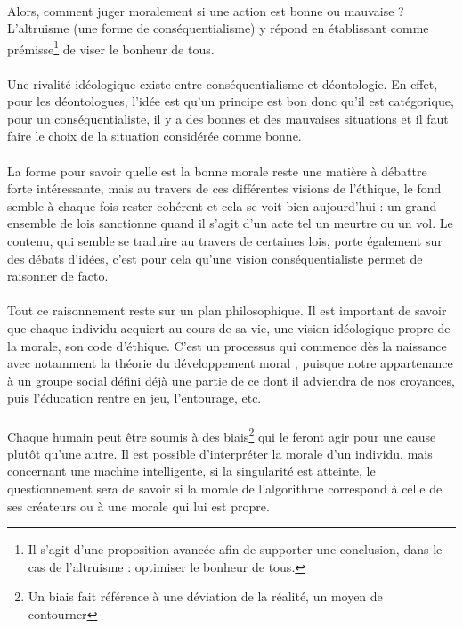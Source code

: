 \documentclass[10pt, french, a4paper]{article}
\begin{document}
\paragraph{}
Alors, comment juger moralement si une action est bonne ou mauvaise ? L’altruisme (une forme de conséquentialisme) y répond en établissant comme prémisse\footnote{Il s'agit d'une proposition avancée afin de supporter une conclusion, dans le cas de l'altruisme : optimiser le bonheur de tous.} de viser le bonheur de tous.

\paragraph{}
Une rivalité idéologique existe entre conséquentialisme et déontologie. En effet, pour les déontologues, l’idée est qu’un principe est bon donc qu’il est catégorique, pour un conséquentialiste, il y a des bonnes et des mauvaises situations et il faut faire le choix de la situation considérée comme bonne.

\paragraph{}
La forme pour savoir quelle est la bonne morale reste une matière à débattre forte intéressante, mais au travers de ces différentes visions de l’éthique, le fond semble à chaque fois rester cohérent et cela se voit bien aujourd’hui : un grand ensemble de lois sanctionne quand il s’agit d’un acte tel un meurtre ou un vol. Le contenu, qui semble se traduire au travers de certaines lois, porte également sur des débats d’idées, c’est pour cela qu’une vision conséquentialiste permet de raisonner de facto.

\paragraph{}
Tout ce raisonnement reste sur un plan philosophique. Il est important de savoir que chaque individu acquiert au cours de sa vie, une vision idéologique propre de la morale, son code d’éthique. C’est un processus qui commence dès la naissance avec notamment la théorie du développement moral \citep{kohlberg_moral_1977}, puisque notre appartenance à un groupe social défini déjà une partie de ce dont il adviendra de nos croyances, puis l’éducation rentre en jeu, l’entourage, etc.

\paragraph{}
Chaque humain peut être soumis à des biais\footnote{Un biais fait référence à une déviation de la réalité, un moyen de contourner} qui le feront agir pour une cause plutôt qu’une autre. Il est possible d’interpréter la morale d'un individu, mais concernant une machine intelligente, si la singularité est atteinte, le questionnement sera de savoir si la morale de l'algorithme correspond à celle de ses créateurs ou à une morale qui lui est propre.
\end{document}
